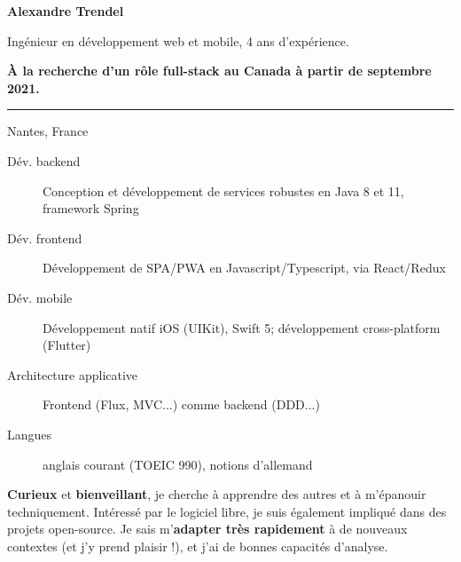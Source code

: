 \documentclass{cv}
\begin{document}
\pagestyle{empty}

\noindent\begin{minipage}[t]{0.5\textwidth}

	\textbf{\color{solviolet} \LARGE Alexandre Trendel}\smallskip

	Ingénieur en développement web et mobile, 4 ans d'expérience. \smallskip
	
	\textbf{À la recherche d'un rôle full-stack au Canada à partir de septembre 2021.}

	\color{solviolet}\rule{2cm}{1pt}
	
\end{minipage}\hfill%
\begin{minipage}[t]{0.3\textwidth}


	 Nantes, France
	\newline{} %
	\newline{} \href{mailto:%
	}{\link{%
	}}%
	\newline{} \href{https://github.com/xou816}{} 

\end{minipage}


\begin{description}
\item[Dév. backend] Conception et développement de services robustes en Java 8 et 11, framework Spring
\item[Dév. frontend] Développement de SPA/PWA en Javascript/Typescript, via React/Redux
\item[Dév. mobile] Développement natif iOS (UIKit), Swift 5; développement cross-platform (Flutter)
\item[Architecture applicative] Frontend (Flux, MVC...) comme backend (DDD...)
\item[Langues] anglais courant (TOEIC 990), notions d'allemand
\end{description}


\textbf{Curieux} et \textbf{bienveillant}, je cherche à apprendre des autres et à m'épanouir techniquement. 
Intéressé par le logiciel libre, je suis également impliqué dans des projets open-source. 
Je sais m'\textbf{adapter très rapidement} à de nouveaux contextes (et j'y prend plaisir !), et j'ai 
de bonnes capacités d'analyse.
\end{document}
